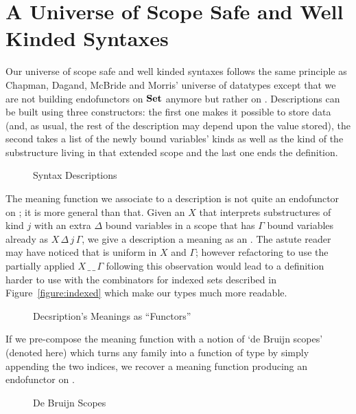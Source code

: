 \section{A Universe of Scope Safe and Well Kinded Syntaxes}

Our universe of scope safe and well kinded syntaxes follows the same principle
as Chapman, Dagand, McBride and Morris' universe of datatypes except that we
are not building endofunctors on $\mathbf{Set}{}$ anymore but rather
on  . Descriptions can be built using three constructors:
the first one makes it possible to store data (and, as usual, the rest of
the description may depend upon the value stored), the second takes a list
of the newly bound variables' kinds as well as the kind of the substructure
living in that extended scope and the last one ends the definition.

\begin{figure}[h]
\caption{Syntax Descriptions}
\end{figure}

The meaning function  we associate to a description is not
quite an endofunctor on  ; it is more general than that.
Given an $X$ that interprets substructures of kind $j$ with an extra $Δ$ bound
variables in a scope that has $Γ$ bound variables already as $X\,Δ\,j\,Γ$,
we give a description a meaning as an  . The astute reader
may have noticed that  is uniform in $X$ and $Γ$; however
refactoring  to use the partially applied $X\,\_\,\_\,Γ$ following
this observation would lead to a definition harder to use with the
combinators for indexed sets described in Figure~\ref{figure:indexed}
which make our types much more readable.

\begin{figure}[h]
\caption{Decsription's Meanings as ``Functors''}
\end{figure}

If we pre-compose the meaning function  with a notion of `de Bruijn scopes'
(denoted  here) which turns any   family into a function
of type      by simply appending the two
 indices, we recover a meaning function producing an endofunctor on  .

\begin{figure}[h]
\caption{De Bruijn Scopes}
\end{figure}

